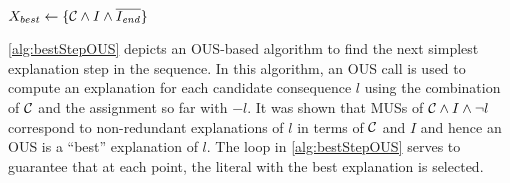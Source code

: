 \begin{algorithm}[ht]
  \caption{$\call{bestStep--OUS}({\cal C},f,I,\Iend)$}
  \label{alg:bestStepOUS}
$X_{best} \gets \{{\cal C} \land I \land \overline{I_{\mathit{end}}}\}$\;
\end{algorithm}

\cref{alg:bestStepOUS} depicts an OUS-based algorithm to find the next simplest explanation step in the sequence. 
In this algorithm, an OUS call is used to compute an explanation for each candidate consequence $l$ using the combination of $\mathcal{C} $ and the assignment so far with $-l$. 
It was shown that MUSs of $\mathcal{C} \land I\land\lnot l$ correspond to non-redundant explanations of $l$ in terms of $\mathcal{C} $ and $I$ and hence an OUS is a ``best'' explanation of $l$. 
The loop in \cref{alg:bestStepOUS} serves to guarantee that at each point, the literal with the best explanation is selected. 






